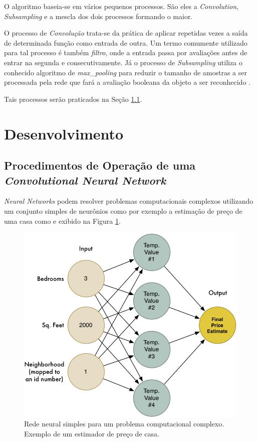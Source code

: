 \documentclass[10pt, conference]{IEEEtran}
\begin{document}
		O algoritmo baseia-se em vários pequenos processos. São eles a \textit{Convolution}, \textit{Subsampling} e a mescla dos dois processos formando o maior.

		O processo de \textit{Convolução} trata-se da prática de aplicar repetidas vezes a saída de determinada função como entrada de outra. Um termo comumente utilizado para tal processo é também \textit{filtro}, onde a entrada passa por avaliações antes de entrar na segunda e consecutivamente. Já o processo de \textit{Subsampling} utiliza o conhecido algoritmo de \textit{max\_pooling} para reduzir o tamanho de amostras a ser processada pela rede que fará a avaliação booleana da objeto a ser reconhecido \cite{Giusti2013}.

		Tais processos serão praticados na Seção \ref{sec:cnn}.


\section{Desenvolvimento} \label{sec:desenvolvimento}

	\subsection{Procedimentos de Operação de uma \textit{Convolutional Neural Network}} \label{sec:cnn}

		\textit{Neural Networks} podem resolver problemas computacionais complexos utilizando um conjunto simples de neurônios como por exemplo a estimação de preço de uma casa como
		e exibido na Figura \ref{fig:simple_neural}.

		\begin{figure}[H]
			\centering
			\includegraphics[width=1.0\linewidth]{img/simple_neural.png}
			\caption{Rede neural simples para um problema computacional complexo. Exemplo de um estimador de preço de casa.}
			\label{fig:simple_neural}
		\end{figure}
\end{document}
